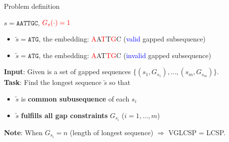 \documentclass{beamer}
\begin{document}
\begin{frame}{Problem definition}

   \begin{example}
      $s=\texttt{AATTGC}$, $\textcolor{red}{G_s(\cdot)=1}$
      \begin{itemize}
         \item  $\tilde{s}=\texttt{ATG}$, the embedding: \textcolor{red}{A}A\textcolor{red}{T}T\textcolor{red}{G}C (\textcolor{blue}{valid} gapped subsequence)
         \item  $\tilde{s}=\texttt{ATG}$, the embedding: \textcolor{red}{A}A{T}\textcolor{red}{T}\textcolor{red}{G}C (\textcolor{blue}{invalid} gapped subsequence)
      \end{itemize}
   \end{example} \vspace{0.3cm}
    
   \begin{definition}
        \textbf{Input}: Given is a set of gapped sequences $\{ (s_1, G_{s_1}), \ldots, (s_m, G_{s_m}) \}$. \\
        \textbf{Task}: Find the longest  sequence $\tilde{s}$ so that 
        \begin{itemize}
            \item  $\tilde{s}$ is \textbf{common subusequence} of each $s_i$
            \item $\tilde{s}$ \textbf{fulfills all gap constraints} $G_{s_i}$ ($i=1, \ldots, m$)
        \end{itemize}
    \end{definition}
    \textbf{Note}: When $G_{s_i}=n$ (length of longest sequence) $\Rightarrow$ VGLCSP = LCSP.
\end{frame}
\end{document}
